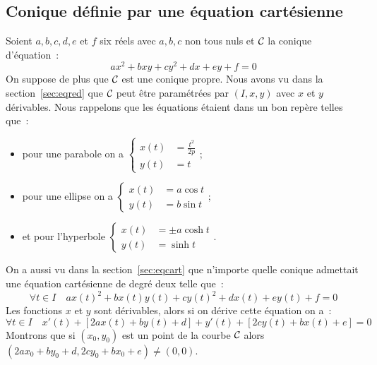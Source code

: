 \subsection{Conique définie par une équation cartésienne}
Soient $a,b,c,d,e$ et $f$ six réels avec $a,b,c$ non tous nuls et $\mathcal{C}_{}$ la conique d'équation~:
\begin{equation}
  ax^2+bxy+cy^2+dx+ey+f=0
\end{equation}
On suppose de plus que $\mathcal{C}_{}$ est une conique propre. Nous avons vu dans la section~\ref{sec:eqred} que $\mathcal{C}_{}$ peut être paramétrées par $(I,x,y)$ avec $x$ et $y$ dérivables. Nous rappelons que les équations étaient dans un bon repère telles que~:
\begin{itemize}
\item pour une parabole on a $\begin{cases} x(t) &= \frac{t^2}{2p} \\ y(t) &= t \end{cases}$;
\item pour une ellipse on a $\begin{cases} x(t) &= a\cos t\\ y(t) &= b\sin t \end{cases}$;
\item  et pour l'hyperbole $\begin{cases} x(t) &= \pm a\cosh t\\ y(t) &= \sinh t \end{cases}$.
\end{itemize}
On a aussi vu dans la section~\ref{sec:eqcart} que n'importe quelle conique admettait une équation cartésienne de degré deux telle que~:
\begin{equation}
\forall t \in I \quad   ax(t)^2+bx(t)y(t)+cy(t)^2+dx(t)+ey(t)+f=0
\end{equation}
Les fonctions $x$ et $y$ sont dérivables, alors si on dérive cette équation on a~:
\begin{equation}
  \forall t \in I \quad x'(t)+[2ax(t)+by(t)+d]+y'(t)+[2cy(t)+bx(t)+e]=0
\end{equation}
Montrons que si $(x_0,y_0)$ est un point de la courbe $\mathcal{C}_{}$ alors $(2ax_0+by_0+d,2cy_0+bx_0+e)\neq (0,0)$.
